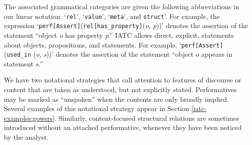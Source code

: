 \documentclass[smallextended,oneside]{svjour3}       %
\newcommand\nothing[1]{#1}
\let\paragraph\nothing
\begin{document}
\paragraph{The associated grammatical categories are given the following abbreviations in our linear notation: `\texttt{rel}', `\texttt{value}', `\texttt{meta}', and \texttt{struct}'.}  For example, the expression
`\texttt{perf[Assert]}(\texttt{rel[has\_property]}(\emph{o},
\emph{p}))' denotes the assertion of the statement
``object \emph{o} has property \emph{p}.'' 
IATC allows direct, explicit, statements about objects, propositions, and statements.  For example, `\texttt{perf[Assert]}(\texttt{used\_in} (\emph{o}, \emph{s}))' denotes the assertion of the statement ``object $o$ appears in statement $s$.''

We have two notational strategies that call attention to features of discourse or content that are
taken as understood, but not explicitly stated.
Performatives may be marked as ``unspoken'' when the contents are only broadly implied.
Several examples of this notational strategy appear
in Section \ref{iatc-examples:gowers}.
Similarly, content-focused structural relations are sometimes introduced without an attached performative, whenever they have been noticed by the analyst.
\end{document}
